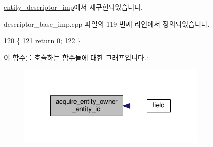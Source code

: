 \hyperlink{classavdecc__lib_1_1entity__descriptor__imp_a507b250a984bb5611d2699cd26d60a51}{entity\+\_\+descriptor\+\_\+imp}에서 재구현되었습니다.



descriptor\+\_\+base\+\_\+imp.\+cpp 파일의 119 번째 라인에서 정의되었습니다.


\begin{DoxyCode}
120 \{
121     \textcolor{keywordflow}{return} 0;
122 \}
\end{DoxyCode}


이 함수를 호출하는 함수들에 대한 그래프입니다.\+:
\nopagebreak
\begin{figure}[H]
\begin{center}
\leavevmode
\includegraphics[width=260pt]{classavdecc__lib_1_1descriptor__base__imp_a507b250a984bb5611d2699cd26d60a51_icgraph}
\end{center}
\end{figure}


